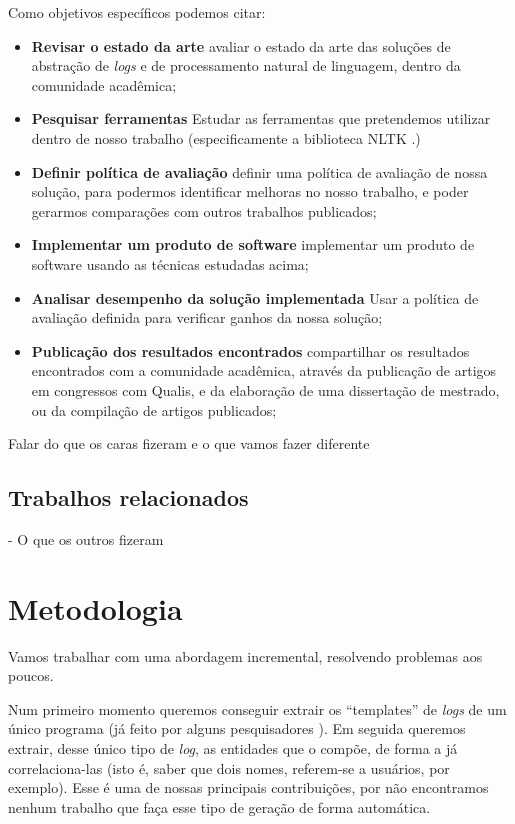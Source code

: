 \documentclass[
	12pt,				%
	openright,			%
	twoside,			%
	a4paper,			%
	english,			%
	french,				%
	spanish,			%
	brazil,				%
	]{abntex2}
\begin{document}
Como objetivos específicos podemos citar:
\begin{itemize}
	\item{\textbf{Revisar o estado da arte}} avaliar o estado da arte das soluções de abstração de \emph{logs} e de processamento natural de linguagem, dentro da comunidade acadêmica;

	\item{\textbf{Pesquisar ferramentas}} Estudar as ferramentas que pretendemos utilizar dentro de nosso trabalho (especificamente a biblioteca NLTK \cite{bird2009natural}.)
	
	\item{\textbf{Definir política de avaliação}} definir uma política de avaliação de nossa solução, para podermos identificar melhoras no nosso trabalho, e poder gerarmos comparações com outros trabalhos publicados;
	
	\item{\textbf{Implementar um produto de software}} implementar um produto de software usando as técnicas estudadas acima;
	
	\item{\textbf{Analisar desempenho da solução implementada}} Usar a política de avaliação definida para verificar ganhos da nossa solução;
	
	\item{\textbf{Publicação dos resultados encontrados}} compartilhar os resultados encontrados com a comunidade acadêmica, através da publicação de artigos em congressos com Qualis, e  da elaboração de uma dissertação de mestrado, ou da compilação de artigos publicados;
	
\end{itemize}


Falar do que os caras fizeram e o que vamos fazer diferente

\subsection{Trabalhos relacionados}
- O que os outros fizeram

\section{Metodologia}

Vamos trabalhar com uma abordagem incremental, resolvendo problemas aos poucos.

Num primeiro momento queremos conseguir extrair os ``templates'' de \emph{logs} de um único programa (já feito por alguns pesquisadores \cite{nagappan2010abstracting}). Em seguida queremos extrair, desse único tipo de \emph{log}, as entidades que o compõe, de forma a já correlaciona-las (isto é, saber que dois nomes, referem-se a usuários, por exemplo). Esse é uma de nossas principais contribuições, por não encontramos nenhum trabalho que faça esse tipo de geração de forma automática.
\end{document}

